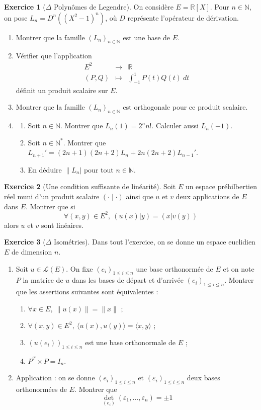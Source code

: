 \documentclass[french]{book}
\newcommand{\N}{\mathbb{N}}
\newcommand{\R}{\mathbb{R}}
\newcommand{\st}{^*}
\theoremstyle{definition}
\newtheorem{ex}{Exercice}[chapter]
\theoremstyle{theorem}
\theoremstyle{remark}
\begin{document}
\begin{ex}[$\Delta$ Polynômes de Legendre]
	On considère $E=\R[X]$. Pour $n\in\N$, on pose $L_n=D^n((X^2-1)^n)$, où $D$ représente l'opérateur de dérivation.
	\begin{enumerate}
		\item Montrer que la famille $(L_n)_{n\in\N}$ est une base de $E$.
		\item Vérifier que l'application $$\begin{array}{rcl}
			E^2&\longrightarrow&\R \\
			(P,Q)&\longmapsto&\int_{-1}^{1}P(t)Q(t)\ dt
		\end{array}$$ définit un produit scalaire sur $E$.
		\item Montrer que la famille $(L_n)_{n\in\N}$ est orthogonale pour ce produit scalaire.
		\item \begin{enumerate}[label=\alph*.]
			\item Soit $n\in\N$. Montrer que $L_n(1)=2^nn!$. Calculer aussi $L_n(-1)$.
			\item Soit $n\in\N\st$. Montrer que $L_{n+1}'=(2n+1)(2n+2)L_n+2n(2n+2)L_{n-1}'$.
			\item En déduire $\lVert L_n\rvert$ pour tout $n\in\N$.	
		\end{enumerate}
	\end{enumerate}
\end{ex}

\begin{ex}[Une condition suffisante de linéarité] Soit $E$ un espace préhilbertien réel muni d'un produit scalaire $(\cdot\mid\cdot)$ ainsi que $u$ et $v$ deux applications de $E$ dans $E$. Montrer que si $$\forall (x,y)\in E^2,\ (u(x)|y)=(x|v(y))$$ alors $u$ et $v$ sont linéaires.
\end{ex}

\begin{ex}[$\Delta$ Isométries]
	Dans tout l'exercice, on se donne un espace euclidien $E$ de dimension $n$.
	\begin{enumerate}
		\item Soit $u\in\mathcal{L}(E)$. On fixe $(e_i)_{1\leqslant i\leqslant n}$ une base orthonormée de $E$ et on note $P$ la matrice de $u$ dans les bases de départ et d'arrivée $(e_i)_{1\leqslant i\leqslant n}$. Montrer que les assertions suivantes sont équivalentes : 
		\begin{enumerate}[label=\roman*)]
			\item $\forall x\in E,\ \lVert u(x)\rVert=\lVert x\rVert$ ;
			\item $\forall (x,y)\in E^2,\ \langle u(x),u(y)\rangle=\langle x,y\rangle$ ;
			\item $(u(e_i))_{1\leqslant i\leqslant n}$ est une base orthonormale de $E$ ;
			\item $P^T\times P=I_n$.
		\end{enumerate}
		\item Application : on se donne $(e_i)_{1\leqslant i\leqslant n}$ et $(\varepsilon_i)_{1\leqslant i\leqslant n}$ deux bases orthonormées de $E$. Montrer que $$\det_{(e_i)}(\varepsilon_1,\ldots,\varepsilon_n)=\pm 1$$
	\end{enumerate}
\end{ex}
\end{document}
